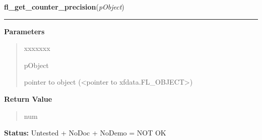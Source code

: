 \hspace{.8\funcindent}\begin{boxedminipage}{\funcwidth}

    \raggedright \textbf{fl\_get\_counter\_precision}(\textit{pObject})

    \vspace{-1.5ex}

    \rule{\textwidth}{0.5\fboxrule}
\setlength{\parskip}{2ex}
\setlength{\parskip}{1ex}
      \textbf{Parameters}
      \vspace{-1ex}

      \begin{quote}
        \begin{Ventry}{xxxxxxx}

          \item[pObject]

          pointer to object ({\textless}pointer to 
          xfdata.FL\_OBJECT{\textgreater})

        \end{Ventry}

      \end{quote}

      \textbf{Return Value}
    \vspace{-1ex}

      \begin{quote}
      num

      \end{quote}

\textbf{Status:} Untested + NoDoc + NoDemo = NOT OK



    \end{boxedminipage}

    \label{xformslib:library:fl_get_counter_value}

    \vspace{0.5ex}

